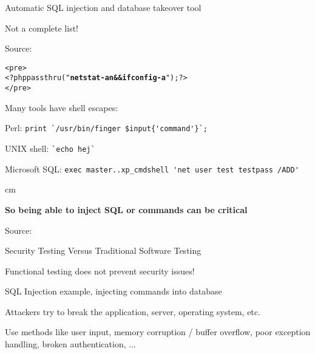 \documentclass[Screen16to9,17pt]{foils}
\begin{document}
\begin{list1}
\item Automatic SQL injection and database takeover tool
\end{list1}




Not a complete list!

Source: 


\begin{alltt}
<pre>
<?php passthru("{\bfseries netstat -an && ifconfig -a}"); ?>
</pre>
\end{alltt}
\begin{list1}
\item Many tools have shell escapes:
\begin{list2}
\item Perl: \verb+print `/usr/bin/finger $input{'command'}`;+
\item UNIX shell: \verb+`echo hej`+
\item Microsoft SQL: \verb+exec master..xp_cmdshell 'net user test testpass /ADD'+
\end{list2}
\end{list1}

 cm

\centerline{\bfseries So being able to inject SQL or commands can be critical}




Source:


\begin{list2}
\item Security Testing Versus Traditional Software Testing
\item Functional testing does not prevent security issues!
\item SQL Injection example, injecting commands into database
\item Attackers try to break the application, server, operating system, etc.
\item Use methods like user input, memory corruption / buffer overflow, poor exception handling, broken authentication, ...
\end{list2}
\end{document}
